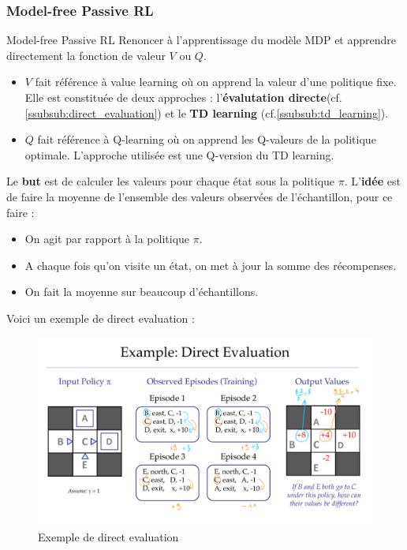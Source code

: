 \subsubsection{Model-free Passive RL} %
\label{ssub:model_free_passive_rl}
\begin{definition}{Model-free Passive RL}{}
    Renoncer à l'apprentissage du modèle MDP et apprendre directement la fonction de valeur $V$ ou $Q$.\\
    \begin{itemize}[label=\textbullet]
        \item $V$ fait référence à value learning où on apprend la valeur d'une politique fixe. Elle est constituée
        de deux approches : l'\textbf{évalutation directe}(cf.\ref{ssubsub:direct_evaluation}) et le \textbf{TD learning}
        (cf.\ref{ssubsub:td_learning}).
        \item $Q$ fait référence à Q-learning où on apprend les Q-valeurs de la politique optimale. L'approche utilisée
        est une Q-version du TD learning.
    \end{itemize}
\end{definition}

\label{ssubsub:direct_evaluation}
Le \textbf{but} est de calculer les valeurs pour chaque état sous la politique $\pi$. L'\textbf{idée} est de faire la moyenne
de l'ensemble des valeurs observées de l'échantillon, pour ce faire :
\begin{itemize}[label=\textbullet]
    \item On agit par rapport à la politique $\pi$.
    \item A chaque fois qu'on visite un état, on met à jour la somme des récompenses.
    \item On fait la moyenne sur beaucoup d'échantillons.
\end{itemize}
\begin{example}
    Voici un exemple de direct evaluation :
    \begin{figure}[H]
        \centering
        \includegraphics[width=0.7\linewidth]{pictures/example_direct_evaluation.pdf}
        \caption{Exemple de direct evaluation}
        \label{fig:direct_evaluation}
    \end{figure}
\end{example}

